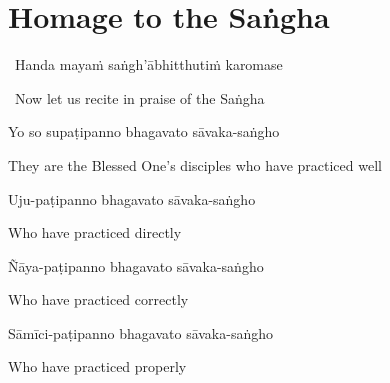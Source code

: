 \suttaRef{[Trad]}

\section{Homage to the Saṅgha}
\label{homage-sangha}

\begin{leader}
  \anglebracketleft\ \hspace{-0.5mm}Handa mayaṁ saṅgh'ābhitthutiṁ karomase \hspace{-0.5mm}\anglebracketright\
\end{leader}
\begin{leader-english-belowpali}
  \anglebracketleft\ \hspace{-0.5mm}Now let us recite in praise of the Saṅgha \hspace{-0.5mm}\anglebracketright\
\end{leader-english-belowpali}

Yo so supaṭipanno bhagavato sāvaka-saṅgho

\begin{english}
  They are the Blessed One's disciples who have practiced well
\end{english}

Uju-paṭipanno bhagavato sāvaka-saṅgho

\begin{english}
  Who have practiced directly\makeatletter\hyperlink{endnote5-appendix}\makeatother

\end{english}

Ñāya-paṭipanno bhagavato sāvaka-saṅgho

\begin{english}
  Who have practiced correctly\ifdigitalversion\makeatletter\hyperlink{endnote6-appendix}\makeatother\fi

\end{english}

Sāmīci-paṭipanno bhagavato sāvaka-saṅgho

\begin{english}
  Who have practiced properly\ifdigitalversion\makeatletter\hyperlink{endnote7-appendix}\makeatother\fi

\end{english}

